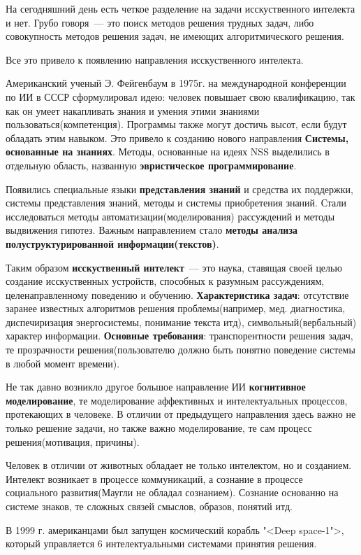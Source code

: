 На сегодняшний день есть четкое разделение на задачи исскуственного интелекта и нет. Грубо говоря~--- это поиск методов решения трудных задач, либо совокупность методов решения задач, не имеющих алгоритмического решения. 

Все это привело к появлению направления исскуственного интелекта.

Американский ученый Э. Фейгенбаум в 1975г. на международной конференции по ИИ в СССР сформулировал идею: человек повышает свою квалификацию, так как он умеет накапливать знания и умения этими знаниями пользоваться(компетенция). Программы также могут достичь высот, если будут обладать этим навыком. Это привело к созданию нового направления \textbf{Системы, основанные на знаниях}. Методы, основанные на идеях NSS выделились в отдельную область, названную \textbf{эвристическое программирование}.

Появились специальные языки \textbf{представления знаний} и средства их поддержки, системы представления знаний, методы и системы приобретения знаний. Стали исследоваться методы автоматизации(моделирования) рассуждений и методы выдвижения гипотез. Важным направлением стало \textbf{методы анализа полуструктурированной информации(текстов)}.

Таким образом \textbf{исскуственный интелект}~--- это наука, ставящая своей целью создание исскуственных устройств, способных к разумным рассуждениям, целенаправленному поведению и обучению. \textbf{Характеристика задач}: отсутствие заранее известных алгоритмов решения проблемы(например, мед. диагностика, диспечиризация энергосистемы, понимание текста итд), символьный(вербальный) характер информации. \textbf{Основные требования}: транспорентности решения задач, те прозрачности решения(пользователю должно быть понятно поведение системы в любой момент времени).

Не так давно возникло другое большое направление ИИ \textbf{когнитивное моделирование}, те моделирование аффективных и интелектуальных процессов, протекающих в человеке. В отличии от предыдущего направления здесь важно не только решение задачи, но также важно моделирование, те сам процесс решения(мотивация, причины).

Человек в отличии от животных обладает не только интелектом, но и созданием. Интелект возникает в процессе коммуникаций, а сознание в процессе социального развития(Маугли не обладал сознанием). Сознание основанно на системе знаков, те сложных связей смыслов, образов, понятий итд.

В 1999 г. американцами был запущен космический корабль "<Deep space-1">, который управляется 6 интелектуальными системами принятия решения.


